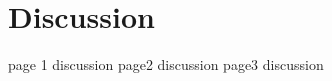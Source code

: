 \chapter{Discussion} \label{chapter:07:discussion}
page 1 discussion
\newpage
page2 discussion
\newpage
page3 discussion